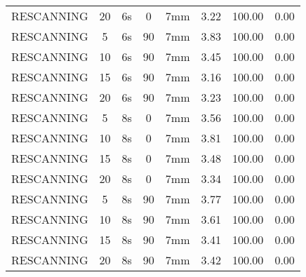 \begin{table}[H]
\begin{tabular}{|c|c||c|c|c||c|c|c|}
RESCANNING & 20 & 6s & 0 & 7mm & 3.22 & 100.00 & 0.00 \\
RESCANNING & 5 & 6s & 90 & 7mm & 3.83 & 100.00 & 0.00 \\
RESCANNING & 10 & 6s & 90 & 7mm & 3.45 & 100.00 & 0.00 \\
RESCANNING & 15 & 6s & 90 & 7mm & 3.16 & 100.00 & 0.00 \\
RESCANNING & 20 & 6s & 90 & 7mm & 3.23 & 100.00 & 0.00 \\
RESCANNING & 5 & 8s & 0 & 7mm & 3.56 & 100.00 & 0.00 \\
RESCANNING & 10 & 8s & 0 & 7mm & 3.81 & 100.00 & 0.00 \\
RESCANNING & 15 & 8s & 0 & 7mm & 3.48 & 100.00 & 0.00 \\
RESCANNING & 20 & 8s & 0 & 7mm & 3.34 & 100.00 & 0.00 \\
RESCANNING & 5 & 8s & 90 & 7mm & 3.77 & 100.00 & 0.00 \\
RESCANNING & 10 & 8s & 90 & 7mm & 3.61 & 100.00 & 0.00 \\
RESCANNING & 15 & 8s & 90 & 7mm & 3.41 & 100.00 & 0.00 \\
RESCANNING & 20 & 8s & 90 & 7mm & 3.42 & 100.00 & 0.00 \\
     \hline\hline 
  \end{tabular}
\end{table}   


